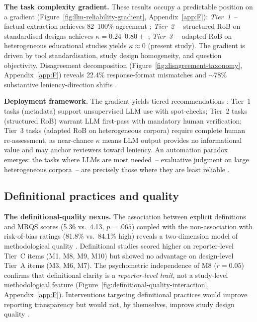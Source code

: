 \textbf{The task complexity gradient.} \label{sec:task-gradient} These results occupy a predictable position on a gradient (Figure~\ref{fig:llm-reliability-gradient}, Appendix~\ref{app:F}): \emph{Tier~1}~-- factual extraction achieves 82--100\% agreement \cite{Kim2025bmj, Purewal2025}; \emph{Tier~2}~-- structured RoB on standardised designs achieves $\kappa = 0.24$--$0.80+$ \cite{Lai2024jama, Taneri2025, Xia2025}; \emph{Tier~3}~-- adapted RoB on heterogeneous educational studies yields $\kappa \approx 0$ (present study). The gradient is driven by tool standardisation, study design homogeneity, and question objectivity. Disagreement decomposition (Figure~\ref{fig:disagreement-taxonomy}, Appendix~\ref{app:F}) reveals 22.4\% response-format mismatches and $\sim$78\% substantive leniency-direction shifts \cite{Korniienko2025mrqs}.

\textbf{Deployment framework.} \label{sec:llm-deployment} The gradient yields tiered recommendations \cite{Korniienko2025mrqs, Khraisha2023}: Tier~1 tasks (metadata) support unsupervised LLM use with spot-checks; Tier~2 tasks (structured RoB) warrant LLM first-pass with mandatory human verification; Tier~3 tasks (adapted RoB on heterogeneous corpora) require complete human re-assessment, as near-chance $\kappa$ means LLM output provides no informational value and may anchor reviewers toward leniency. An automation paradox emerges: the tasks where LLMs are most needed~-- evaluative judgment on large heterogeneous corpora~-- are precisely those where they are least reliable \cite{Wang2025aera, Blaizot2022, Rubinstein2025}.

\subsection{Definitional practices and quality} \label{sec:def-quality}

\textbf{The definitional-quality nexus.} \label{sec:def-quality-nexus} The association between explicit definitions and MRQS scores (5.36 vs.\ 4.13, $p = .065$) coupled with the non-association with risk-of-bias ratings (81.8\% vs.\ 84.1\% high) reveals a two-dimension model of methodological quality \cite{Korniienko2025mrqs, KorniienkoSemerikov2024}. Definitional studies scored higher on reporter-level Tier~C items (M1, M8, M9, M10) but showed no advantage on design-level Tier~A items (M3, M6, M7). The psychometric independence of M8 ($r = 0.05$) confirms that definitional clarity is a \emph{reporter-level trait}, not a study-level methodological feature (Figure~\ref{fig:definitional-quality-interaction}, Appendix~\ref{app:F}). Interventions targeting definitional practices would improve reporting transparency but would not, by themselves, improve study design quality \cite{DichevDicheva2017, Clark2016}.

